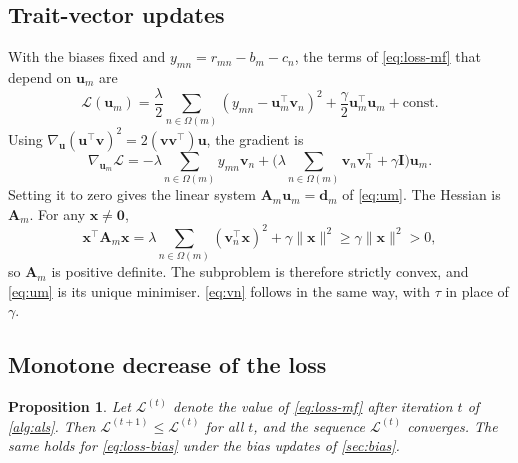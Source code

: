 \documentclass{article}
\theoremstyle{plain}
\newtheorem{proposition}[theorem]{Proposition}
\theoremstyle{definition}
\theoremstyle{remark}
\begin{document}
\subsection{Trait-vector updates}
\label{app:traits}

With the biases fixed and $y_{mn} = r_{mn} - b_m - c_n$, the terms of
\cref{eq:loss-mf} that depend on $\mathbf{u}_m$ are
\begin{equation*}
  \mathcal{L}(\mathbf{u}_m) = \frac{\lambda}{2} \sum_{n \in \Omega(m)}
  \left( y_{mn} - \mathbf{u}_m^\top \mathbf{v}_n \right)^2
  + \frac{\gamma}{2} \mathbf{u}_m^\top \mathbf{u}_m + \text{const}.
\end{equation*}
Using $\nabla_{\mathbf{u}} (\mathbf{u}^\top \mathbf{v})^2 = 2(\mathbf{v}\mathbf{v}^\top)\mathbf{u}$,
the gradient is
\begin{equation*}
  \nabla_{\mathbf{u}_m} \mathcal{L}
  = -\lambda \sum_{n \in \Omega(m)} y_{mn} \mathbf{v}_n
    + \Big( \lambda \sum_{n \in \Omega(m)} \mathbf{v}_n \mathbf{v}_n^\top
    + \gamma \mathbf{I} \Big) \mathbf{u}_m .
\end{equation*}
Setting it to zero gives the linear system $\mathbf{A}_m \mathbf{u}_m = \mathbf{d}_m$
of \cref{eq:um}. The Hessian is $\mathbf{A}_m$. For any
$\mathbf{x} \neq \mathbf{0}$,
\begin{equation*}
  \mathbf{x}^\top \mathbf{A}_m \mathbf{x}
  = \lambda \sum_{n \in \Omega(m)} (\mathbf{v}_n^\top \mathbf{x})^2
    + \gamma \|\mathbf{x}\|^2 \geq \gamma \|\mathbf{x}\|^2 > 0,
\end{equation*}
so $\mathbf{A}_m$ is positive definite. The subproblem is therefore strictly
convex, and \cref{eq:um} is its unique minimiser. \cref{eq:vn} follows in
the same way, with $\tau$ in place of $\gamma$.

\subsection{Monotone decrease of the loss}
\label{app:monotone}

\begin{proposition}
Let $\mathcal{L}^{(t)}$ denote the value of \cref{eq:loss-mf} after
iteration $t$ of \cref{alg:als}. Then
$\mathcal{L}^{(t+1)} \leq \mathcal{L}^{(t)}$ for all $t$, and the sequence
$\mathcal{L}^{(t)}$ converges. The same holds for \cref{eq:loss-bias}
under the bias updates of \cref{sec:bias}.
\end{proposition}
\end{document}
